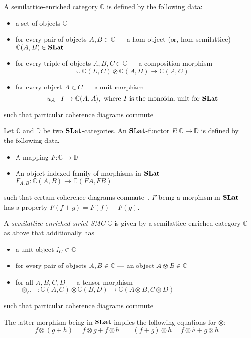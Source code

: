 \begin{definition}
    A semilattice-enriched category $\mathbb{C}$ is defined by the following data:
    \begin{itemize}
        \item a set of objects $\mathbb{C}$
        \item for every pair of objects $A,B \in \mathbb{C}$ --- a hom-object (or, hom-semilattice) $\mathbb{C}(A,B) \in \mathbf{SLat}$
        \item for every triple of objects $A,B,C \in \mathbb{C}$ --- a composition morphism
        \[
            \circ: \mathbb{C}(B,C) \otimes \mathbb{C}(A,B) \to \mathbb{C}(A,C)
        \]
        \item for every object $A \in C$ --- a unit morphism
        \[
        u_{A} : I \to \mathbb{C}(A,A), \text{ where $I$ is the monoidal unit for $\mathbf{SLat}$}
        \]
    \end{itemize}
    such that particular coherence diagrams commute.
\end{definition}

\begin{definition}
	Let $\mathbb{C}$ and $\mathbb{D}$ be two $\mathbf{SLat}$-categories.
	An $\mathbf{SLat}$-functor $F : \mathbb{C} \to \mathbb{D}$ is defined by the following data.
	\begin{itemize}
	  \item A mapping $F : \mathbb{C} \to \mathbb{D}$
	  \item An object-indexed family of morphisms in $\mathbf{SLat}$ $F_{A,B} : \mathbb{C}(A,B) \to \mathbb{D}(FA,FB)$
	\end{itemize}
	such that certain coherence diagrams commute~\cite{Borceux_1994}.
	$F$ being a morphism in $\mathbf{SLat}$ has a property $F(f + g) = F(f) + F(g)$.
\end{definition}


\begin{definition}\label{def:enriched-prop}
    A \textit{semilattice enriched strict SMC}  $\mathbb{C}$ is given by a semilattice-enriched category $\mathbb{C}$ as above that additionally has
    \begin{itemize}
    \item a unit object $I_{C} \in \mathbb{C}$
    \item for every pair of objects $A,B \in \mathbb{C}$ --- an object $A \otimes B \in \mathbb{C}$
    \item for all $A,B,C,D$ --- a tensor morphism $ - \otimes_{C} - : \mathbb{C}(A,C) \otimes \mathbb{C}(B,D) \to \mathbb{C}(A \otimes B, C \otimes D)$
    \end{itemize}
    such that particular coherence diagrams commute.
    \end{definition}
    The latter morphism being in $\mathbf{SLat}$ implies the following equations for $\otimes$:
    \[
    f \otimes (g+h) = f \otimes g + f \otimes h \qquad (f+g) \otimes h = f \otimes h + g \otimes h
    \]
    
